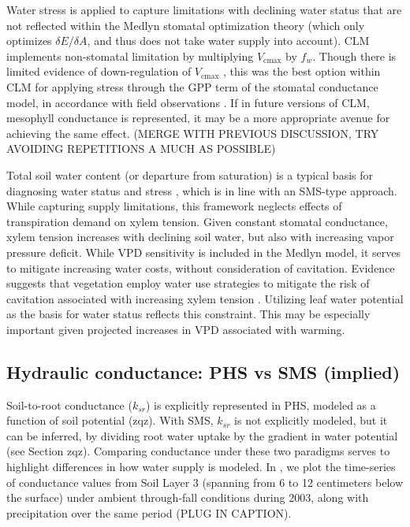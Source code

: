 \documentclass[draft,linenumbers]{agujournal}
\begin{document}
    Water stress is applied to capture limitations with declining water status that are not reflected within the Medlyn stomatal optimization theory (which only optimizes $\delta E / \delta A$, and thus does not take water supply into account). CLM implements non-stomatal limitation by multiplying $V_{\text{cmax}}$ by $f_w$. Though there is limited evidence of down-regulation of $V_{\text{cmax}}$ \citep{flexas2006}, this was the best option within CLM  for applying stress through the GPP term of the stomatal conductance model, in accordance with field observations \citep{lin2018,zhou2013}.
    If in future versions of CLM, mesophyll conductance is represented, it may be a more appropriate avenue for achieving the same effect. (MERGE WITH PREVIOUS DISCUSSION, TRY AVOIDING REPETITIONS A MUCH AS POSSIBLE)
    
    Total soil water content (or departure from saturation) is a typical basis for diagnosing water status and stress \citep{drake2017}, which is in line with an SMS-type approach.
    While capturing supply limitations, this framework neglects effects of transpiration demand on xylem tension.
    Given constant stomatal conductance, xylem tension increases with declining soil water, but also with increasing vapor pressure deficit.
    While VPD sensitivity is included in the Medlyn model, it serves to mitigate increasing water costs, without consideration of cavitation.
    Evidence suggests that vegetation employ water use strategies to mitigate the risk of cavitation associated with increasing xylem tension \citep{sperry1998,fisher2006,choat2012}.
    Utilizing leaf water potential as the basis for water status reflects this constraint.
    This may be especially important given projected increases in VPD associated with warming.

\subsection{Hydraulic conductance: PHS vs SMS (implied)}

\label{sect:cond}
    
    Soil-to-root conductance ($k_{sr}$) is explicitly represented in PHS, modeled as a function of soil potential (zqz). With SMS, $k_{sr}$ is not explicitly modeled, but it can be inferred, by dividing root water uptake by the gradient in water potential (see Section zqz). Comparing conductance under these two paradigms serves to highlight differences in how water supply is modeled. In , we plot the time-series of conductance values from Soil Layer 3 (spanning from 6 to 12 centimeters below the surface) under ambient through-fall conditions during 2003, along with precipitation over the same period (PLUG IN CAPTION).
    
\end{document}
